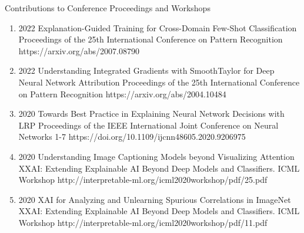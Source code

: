 \documentclass[10pt,a4paper]{article} %
\begin{document}
\headedsection %
{Contributions to Conference Proceedings and Workshops}{}
{
    \begin{enumerate}

        \item[] 
                                {2022}
                                {Explanation-Guided Training for Cross-Domain Few-Shot Classification}
                                {Proceedings of the 25th International Conference on Pattern Recognition}
                                {}
                                {https://arxiv.org/abs/2007.08790}

        \item[] 
                                {2022}
                                {Understanding Integrated Gradients with SmoothTaylor for Deep Neural Network Attribution}
                                {Proceedings of the 25th International Conference on Pattern Recognition}
                                {}
                                {https://arxiv.org/abs/2004.10484}

        \item[] 
                                {2020}
                                {Towards Best Practice in Explaining Neural Network Decisions with LRP}
                                {Proceedings of the IEEE International Joint Conference on Neural Networks}
                                {1-7}
                                {https://doi.org/10.1109/ijcnn48605.2020.9206975}

        \item[] 
                                {2020}
                                {Understanding Image Captioning Models beyond Visualizing Attention}
                                {XXAI: Extending Explainable AI Beyond Deep Models and Classifiers. ICML Workshop}
                                {}
                                {http://interpretable-ml.org/icml2020workshop/pdf/25.pdf}


        \item[] 
                                {2020}
                                {XAI for Analyzing and Unlearning Spurious Correlations in ImageNet}
                                {XXAI: Extending Explainable AI Beyond Deep Models and Classifiers. ICML Workshop}
                                {}
                                {http://interpretable-ml.org/icml2020workshop/pdf/11.pdf}



\end{enumerate}}
\end{document}
